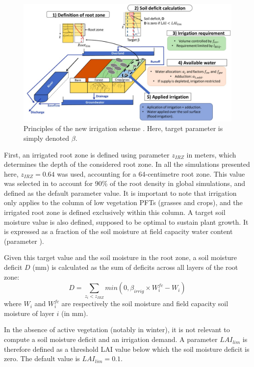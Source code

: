 \begin{figure}[t]
    \centering
    \includegraphics[width=1\textwidth]{images/methods/schema_pedro.png}
    \caption{Principles of the new irrigation scheme \citep[from][]{arboleda-obando_validation_2024}. Here, target parameter \betairrig is simply denoted $\beta$.}
    \label{fig:schema_pedro}
\end{figure}

First, an irrigated root zone is defined using parameter $z_{IRZ}$ in meters, which determines the depth of the considered root zone. In all the simulations presented here, $z_{IRZ} = 0.64$ was used, accounting for a 64-centimetre root zone. This value was selected in \citet{arboleda-obando_validation_2024} to account for 90\% of the root density in global simulations, and defined as the default parameter value. It is important to note that irrigation only applies to the column of low vegetation PFTs (grasses and crops), and the irrigated root zone is defined exclusively within this column.
A target soil moisture value is also defined, supposed to be optimal to sustain plant growth. It is expressed as a fraction of the soil moisture at field capacity water content (parameter \betairrig).

Given this target value and the soil moisture in the root zone, a soil moisture deficit $D$ (mm) is calculated as the sum of deficits across all layers of the root zone:
\begin{equation}
    D = \sum_{z_i < z_{IRZ}} min(0,\beta_{irrig} \times W_i^{fc} - W_i)
\end{equation}
where $W_i$ and $W_i^{fc}$ are respectively the soil moisture and field capacity soil moisture of layer $i$ (in mm).

In the absence of active vegetation (notably in winter), it is not relevant to compute a soil moisture deficit and an irrigation demand. A parameter $LAI_{lim}$ is therefore defined as a threshold LAI value below which the soil moisture deficit is zero. The default value is $LAI_{lim}=0.1$.

